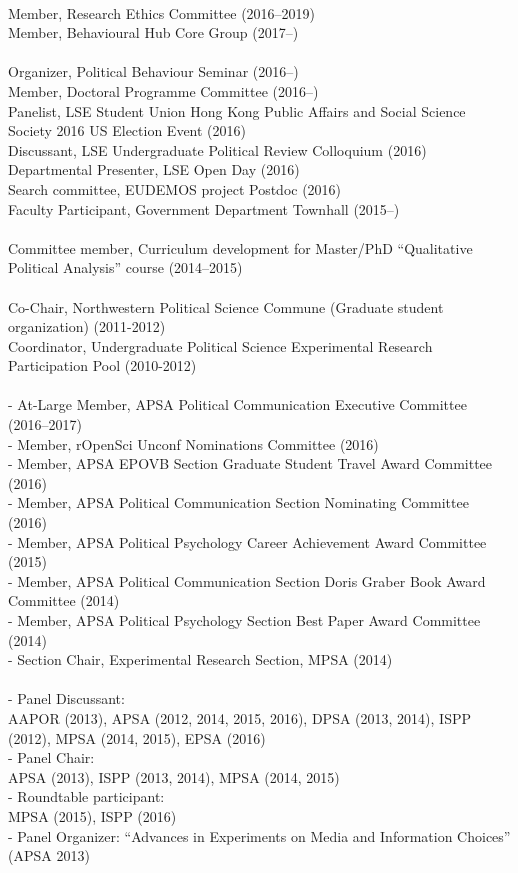 \documentclass[12pt]{article}
\renewcommand{\section}[1]{\pagebreak[3]%
    \llap{\scshape\smash{\parbox[t]{\marginparwidth}{\raggedright {\color{lg}#1}}}}%
    \vspace{-\baselineskip}\par}
\newcommand{\topic}[1]{\pagebreak[3]\indent {\color{lg}{\footnotesize #1 }}\\}
\newcommand{\entry}[1]{\indent {\color{lg}\guillemotright}\hspace{2pt}#1\vspace{.25em}\\}
\newcommand{\subentry}[1]{{\color{lg}-} #1\vspace{.25em}\\}
\begin{document}
\section{Institutional\\ \& Professional Service}
\topic{Institutional (London School of Economics and Political Science)}
	\entry{Member, Research Ethics Committee (2016--2019)}
	\entry{Member, Behavioural Hub Core Group (2017--)}

\topic{Departmental (London School of Economics and Political Science)}
	\entry{Organizer, Political Behaviour Seminar (2016--)}
	\entry{Member, Doctoral Programme Committee (2016--)}
	\entry{Panelist, LSE Student Union Hong Kong Public Affairs and Social Science Society 2016 US Election Event (2016)}
	\entry{Discussant, LSE Undergraduate Political Review Colloquium (2016)}
	\entry{Departmental Presenter, LSE Open Day (2016)}
	\entry{Search committee, EUDEMOS project Postdoc (2016)}
	\entry{Faculty Participant, Government Department Townhall (2015--)}

\topic{Departmental (Aarhus University)}
	\entry{Committee member, Curriculum development for Master/PhD ``Qualitative Political Analysis'' course (2014--2015)}

\topic{Departmental (Northwestern University)}
	\entry{Co-Chair, Northwestern Political Science Commune (Graduate student organization) (2011-2012)}
	\entry{Coordinator, Undergraduate Political Science Experimental Research Participation Pool (2010-2012)}

\topic{Disciplinary Committees}
		\subentry{At-Large Member, APSA Political Communication Executive Committee (2016--2017)}
		\subentry{Member, rOpenSci Unconf Nominations Committee (2016)}
		\subentry{Member, APSA EPOVB Section Graduate Student Travel Award Committee (2016)}
		\subentry{Member, APSA Political Communication Section Nominating Committee (2016)}
		\subentry{Member, APSA Political Psychology Career Achievement Award Committee (2015)}
		\subentry{Member, APSA Political Communication Section Doris Graber Book Award Committee (2014)}
		\subentry{Member, APSA Political Psychology Section Best Paper Award Committee (2014)}
		\subentry{Section Chair, Experimental Research Section, MPSA (2014)}

\topic{Service at Professional Conferences}
		\subentry{Panel Discussant:\\ AAPOR (2013), APSA (2012, 2014, 2015, 2016), DPSA (2013, 2014), ISPP (2012), MPSA (2014, 2015), EPSA (2016)}
		\subentry{Panel Chair:\\ APSA (2013), ISPP (2013, 2014), MPSA (2014, 2015)}
		\subentry{Roundtable participant:\\ MPSA (2015), ISPP (2016)}
		\subentry{Panel Organizer: ``Advances in Experiments on Media and Information Choices'' (APSA 2013)}
\end{document}
